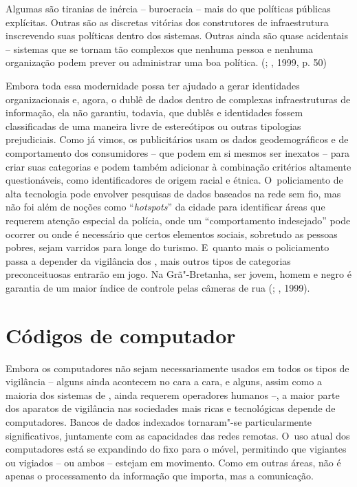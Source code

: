 Algumas são tiranias de inércia -- burocracia -- mais do que políticas
públicas explícitas. Outras são as discretas vitórias dos construtores
de infraestrutura inscrevendo suas políticas dentro dos sistemas. Outras
ainda são quase acidentais -- sistemas que se tornam tão complexos que
nenhuma pessoa e nenhuma organização podem prever ou administrar uma boa
política. (; , 1999, p. 50)

Embora toda essa modernidade possa ter ajudado a gerar identidades
organizacionais e, agora, o dublê de dados dentro de complexas
infraestruturas de informação, ela não garantiu, todavia, que dublês e
identidades fossem classificadas de uma maneira livre de estereótipos ou
outras tipologias prejudiciais. Como já vimos, os publicitários usam os
dados geodemográficos e de comportamento dos consumidores -- que podem
em si mesmos ser inexatos -- para criar suas categorias e podem também
adicionar à combinação critérios altamente questionáveis, como
identificadores de origem racial e étnica. O~policiamento de alta
tecnologia pode envolver pesquisas de dados baseados na rede sem fio,
mas não foi além de noções como ``\emph{hotspots}'' da cidade para
identificar áreas que requerem atenção especial da polícia, onde um
``comportamento indesejado'' pode ocorrer ou onde é necessário que
certos elementos sociais, sobretudo as pessoas pobres, sejam varridos
para longe do turismo. E~quanto mais o policiamento passa a depender da
vigilância dos , mais outros tipos de categorias preconceituosas
entrarão em jogo. Na Grã"-Bretanha, ser jovem, homem e negro é garantia
de um maior índice de controle pelas câmeras de rua (; ,
1999).

\section{Códigos de computador}

Embora os computadores não sejam necessariamente usados em todos os
tipos de vigilância -- alguns ainda acontecem no cara a cara, e alguns,
assim como a maioria dos sistemas de , ainda requerem operadores
humanos --, a maior parte dos aparatos de vigilância nas sociedades
mais ricas e tecnológicas depende de computadores. Bancos de dados
indexados tornaram"-se particularmente significativos, juntamente com as
capacidades das redes remotas. O~uso atual dos computadores está se
expandindo do fixo para o móvel, permitindo que vigiantes ou vigiados
-- ou ambos -- estejam em movimento. Como em outras áreas, não é
apenas o processamento da informação que importa, mas a comunicação.

